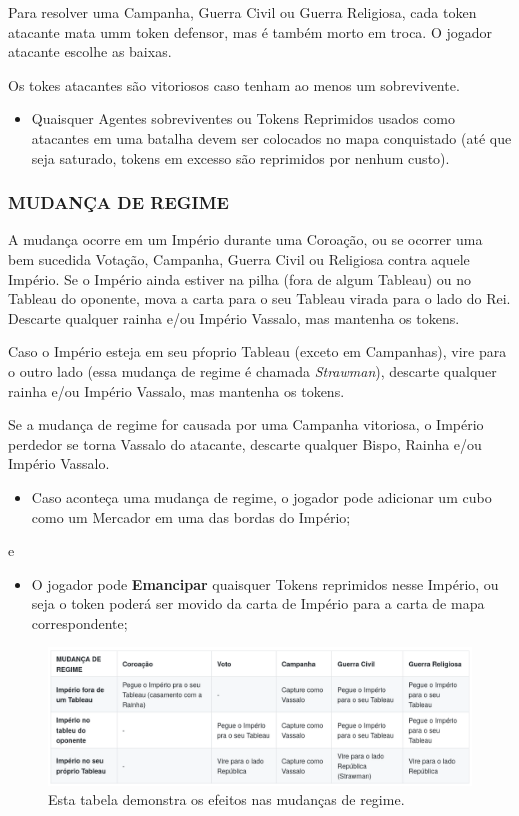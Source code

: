 \documentclass[11pt]{article}
\begin{document}
Para resolver uma Campanha, Guerra Civil ou Guerra Religiosa, cada token atacante mata umm token defensor, mas é também morto em troca. O jogador atacante escolhe as baixas.

Os tokes atacantes são vitoriosos caso tenham ao menos um sobrevivente.

\begin{itemize}
\item Quaisquer Agentes sobreviventes ou Tokens Reprimidos usados como atacantes em uma batalha devem ser colocados no mapa conquistado (até que seja saturado, tokens em excesso são reprimidos por nenhum custo).
\end{itemize}

\subsubsection{MUDANÇA DE REGIME}
\label{sec:orgc7e888a}

A mudança ocorre em um Império durante uma Coroação, ou se ocorrer uma bem sucedida Votação, Campanha, Guerra Civil ou Religiosa contra aquele Império. Se o Império ainda estiver na pilha (fora de algum Tableau)
ou no Tableau do oponente, mova a carta para o seu Tableau virada para o lado do Rei. Descarte qualquer rainha e/ou Império Vassalo, mas mantenha os tokens.

Caso o Império esteja em seu pŕoprio Tableau (exceto em Campanhas), vire para o outro lado (essa mudança de regime é chamada \emph{Strawman}), descarte qualquer rainha e/ou Império Vassalo, mas mantenha os tokens.

Se a mudança de regime for causada por uma Campanha vitoriosa, o Império perdedor se torna Vassalo do atacante, descarte qualquer Bispo, Rainha e/ou Império Vassalo.

\begin{itemize}
\item Caso aconteça uma mudança de regime, o jogador pode adicionar um cubo como um Mercador em uma das bordas do Império;
\end{itemize}

e

\begin{itemize}
\item O jogador pode \textbf{Emancipar} quaisquer Tokens reprimidos nesse Império, ou seja o token poderá ser movido da carta de Império para a carta de mapa correspondente;
\end{itemize}

\begin{figure}[htbp]
\centering
\includegraphics[width=.9\linewidth]{./regime-change.png}
\caption{\label{fig:org993b0e0}
Esta tabela demonstra os efeitos nas mudanças de regime.}
\end{figure}
\end{document}
